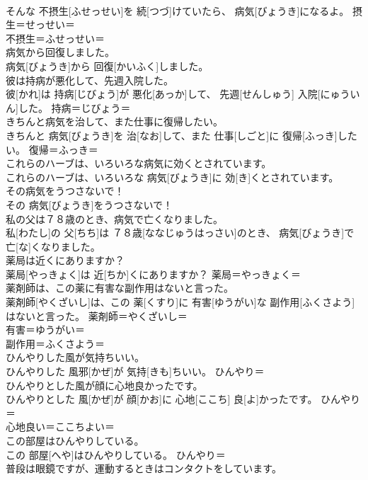 \documentclass[8pt]{extreport}
\begin{document}
\begin{CJK}{UTF8}{min}
\\	そんな 不摂生[ふせっせい]を 続[つづ]けていたら、 病気[びょうき]になるよ。	摂生＝せっせい＝ 
\\	不摂生＝ふせっせい＝ 
\\	病気から回復しました。	
\\	病気[びょうき]から 回復[かいふく]しました。	
\\	彼は持病が悪化して、先週入院した。	
\\	彼[かれ]は 持病[じびょう]が 悪化[あっか]して、 先週[せんしゅう] 入院[にゅういん]した。	持病＝じびょう＝ 
\\	きちんと病気を治して、また仕事に復帰したい。	
\\	きちんと 病気[びょうき]を 治[なお]して、また 仕事[しごと]に 復帰[ふっき]したい。	復帰＝ふっき＝ 
\\	これらのハーブは、いろいろな病気に効くとされています。	
\\	これらのハーブは、いろいろな 病気[びょうき]に 効[き]くとされています。	
\\	その病気をうつさないで！	
\\	その 病気[びょうき]をうつさないで！	
\\	私の父は７８歳のとき、病気で亡くなりました。	
\\	私[わたし]の 父[ちち]は ７８歳[ななじゅうはっさい]のとき、 病気[びょうき]で 亡[な]くなりました。	
\\	薬局は近くにありますか？	
\\	薬局[やっきょく]は 近[ちか]くにありますか？	薬局＝やっきょく＝ 
\\	薬剤師は、この薬に有害な副作用はないと言った。	
\\	薬剤師[やくざいし]は、この 薬[くすり]に 有害[ゆうがい]な 副作用[ふくさよう]はないと言った。	薬剤師＝やくざいし＝ 
\\	有害＝ゆうがい＝ 
\\	副作用＝ふくさよう＝ 
\\	ひんやりした風が気持ちいい。	
\\	ひんやりした 風邪[かぜ]が 気持[きも]ちいい。	ひんやり＝ 
\\	ひんやりとした風が顔に心地良かったです。	
\\	ひんやりとした 風[かぜ]が 顔[かお]に 心地[ここち] 良[よ]かったです。	ひんやり＝ 
\\	心地良い＝ここちよい＝ 
\\	この部屋はひんやりしている。	
\\	この 部屋[へや]はひんやりしている。	ひんやり＝ 
\\	普段は眼鏡ですが、運動するときはコンタクトをしています。	

\end{CJK}
\end{document}
